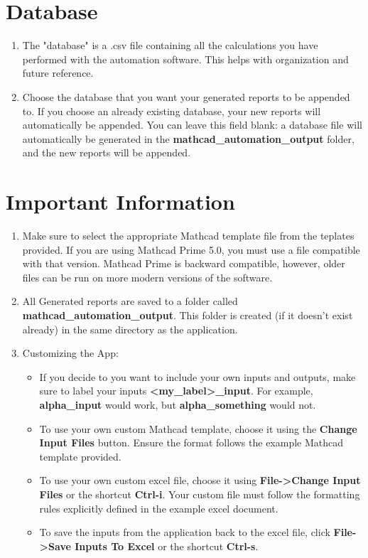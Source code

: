 \documentclass[11pt]{article}
\begin{document}
\section{Database}
\label{sec:org7b67e39}
\begin{enumerate}
\item The "database" is a .csv file containing all the calculations you have performed with the automation software. This helps with organization and future reference.
\item Choose the database that you want your generated reports to be appended to. If you choose an already existing database, your new reports will automatically be appended. You can leave this field blank: a database file will automatically be generated in the \textbf{mathcad\_automation\_output} folder, and the new reports will be appended.
\end{enumerate}
\section{Important Information}
\label{sec:orgc9b376d}
\begin{enumerate}
\item Make sure to select the appropriate Mathcad template file from the teplates provided. If you are using Mathcad Prime 5.0, you must use a file compatible with that version. Mathcad Prime is backward compatible, however, older files can be run on more modern versions of the software.
\item All Generated reports are saved to a folder called \textbf{mathcad\_automation\_output}. This folder is created (if it doesn't exist already) in the same directory as the application.
\item Customizing the App:
\begin{itemize}
\item If you decide to you want to include your own inputs and outputs, make sure to label your inputs \textbf{<my\_label>\_input}. For example, \textbf{alpha\_input} would work, but \textbf{alpha\_something} would not.
\item To use your own custom Mathcad template, choose it using the \textbf{Change Input Files} button. Ensure the format follows the example Mathcad template provided.
\item To use your own custom excel file, choose it using \textbf{File->Change Input Files} or the shortcut \textbf{Ctrl-i}. Your custom file must follow the formatting rules explicitly defined in the example excel document.
\item To save the inputs from the application back to the excel file, click \textbf{File->Save Inputs To Excel} or the shortcut \textbf{Ctrl-s}.
\end{itemize}
\end{enumerate}
\end{document}
